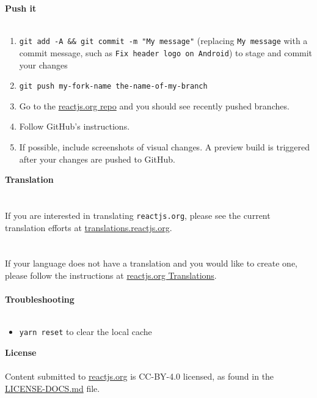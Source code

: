 \documentclass{article}
\begin{document}
{\noindent \Large \textbf{Push it}}\\\\
\begin{enumerate}[label=\arabic*.]
	\item \verb|git add -A && git commit -m "My message"| (replacing \verb|My message| with a commit message, such as \verb|Fix header logo on Android|) to stage and commit your changes
	\item \verb|git push my-fork-name the-name-of-my-branch|
	\item Go to the \href{https://github.com/reactjs/reactjs.org}{reactjs.org repo} and you should see recently pushed branches.
	\item Follow GitHub's instructions.
	\item If possible, include screenshots of visual changes. A preview build is triggered after your changes are pushed to GitHub.
\end{enumerate}
{\noindent \LARGE \textbf{Translation}}\\\\
\\
If you are interested in translating \verb|reactjs.org|, please see the current translation efforts at \href{https://translations.reactjs.org/}{translations.reactjs.org}.\\
\\
\\
If your language does not have a translation and you would like to create one, please follow the instructions at \href{https://github.com/reactjs/reactjs.org-translation#translating-reactjsorg}{reactjs.org Translations}.\\
\\
{\noindent \LARGE \textbf{Troubleshooting}}\\\\
\begin{itemize}
	\item \verb|yarn reset| to clear the local cache
\end{itemize}
{\noindent \LARGE \textbf{License}}\\\\
Content submitted to \href{https://reactjs.org/}{reactjs.org} is CC-BY-4.0 licensed, as found in the \href{https://github.com/open-source-explorer/reactjs.org/blob/master/LICENSE-DOCS.md}{LICENSE-DOCS.md} file.\\
\end{document}
